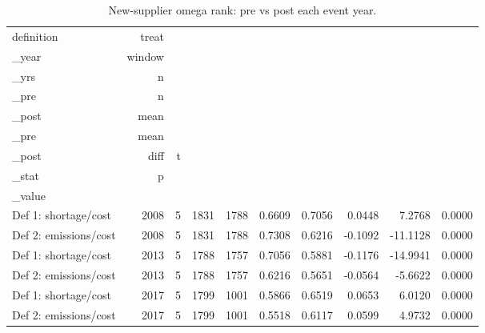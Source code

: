 \begin{table}[ht]
\centering
\caption{New-supplier omega rank: pre vs post each event year.} 
\begin{tabular}{lrrrrrrrrr}
  \toprule
definition & treat\\_year & window\\_yrs & n\\_pre & n\\_post & mean\\_pre & mean\\_post & diff & t\\_stat & p\\_value \\ 
  \midrule
Def 1: shortage/cost &  2008 &     5 &  1831 &  1788 & 0.6609 & 0.7056 & 0.0448 & 7.2768 & 0.0000 \\ 
  Def 2: emissions/cost &  2008 &     5 &  1831 &  1788 & 0.7308 & 0.6216 & -0.1092 & -11.1128 & 0.0000 \\ 
  Def 1: shortage/cost &  2013 &     5 &  1788 &  1757 & 0.7056 & 0.5881 & -0.1176 & -14.9941 & 0.0000 \\ 
  Def 2: emissions/cost &  2013 &     5 &  1788 &  1757 & 0.6216 & 0.5651 & -0.0564 & -5.6622 & 0.0000 \\ 
  Def 1: shortage/cost &  2017 &     5 &  1799 &  1001 & 0.5866 & 0.6519 & 0.0653 & 6.0120 & 0.0000 \\ 
  Def 2: emissions/cost &  2017 &     5 &  1799 &  1001 & 0.5518 & 0.6117 & 0.0599 & 4.9732 & 0.0000 \\ 
   \bottomrule
\end{tabular}
\end{table}
